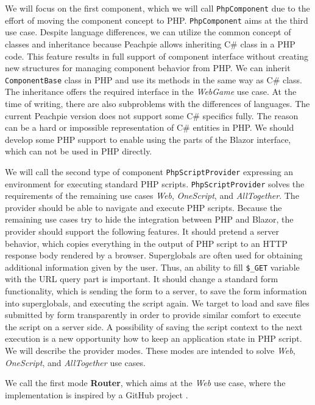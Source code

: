 \par
We will focus on the first component, which we will call \texttt{PhpComponent} due to the effort of moving the component concept to PHP.
\texttt{PhpComponent} aims at the third use case.
Despite language differences, we can utilize the common concept of classes and inheritance because Peachpie allows inheriting C\# class in a PHP code.
This feature results in full support of component interface without creating new structures for managing component behavior from PHP.
We can inherit \texttt{ComponentBase} class in PHP and use its methods in the same way as C\# class.
The inheritance offers the required interface in the \textit{WebGame} use case.
At the time of writing, there are also subproblems with the differences of languages.
The current Peachpie version does not support some C\# specifics fully.
The reason can be a hard or impossible representation of C\# entities in PHP.
We should develop some PHP support to enable using the parts of the Blazor interface, which can not be used in PHP directly.
\par
We will call the second type of component \texttt{PhpScriptProvider} expressing an environment for executing standard PHP scripts.
\texttt{PhpScriptProvider} solves the requirements of the remaining use cases \textit{Web}, \textit{OneScript}, and \textit{AllTogether}.
The provider should be able to navigate and execute PHP scripts.
Because the remaining use cases try to hide the integration between PHP and Blazor, the provider should support the following features.
It should pretend a server behavior, which copies everything in the output of PHP script to an HTTP response body rendered by a browser.
Superglobals are often used for obtaining additional information given by the user.
Thus, an ability to fill \texttt{\$\_GET} variable with the URL query part is important.
It should change a standard form functionality, which is sending the form to a server, to save the form information into superglobals, and executing the script again.
We target to load and save files submitted by form transparently in order to provide similar comfort to execute the script on a server side.
A possibility of saving the script context to the next execution is a new opportunity how to keep an application state in PHP script.
We will describe the provider modes.
These modes are intended to solve \textit{Web}, \textit{OneScript}, and \textit{AllTogether} use cases. 
\par
We call the first mode \textbf{Router}, which aims at the \textit{Web} use case, where the implementation is inspired by a GitHub project \cite{online:customRouter}.
